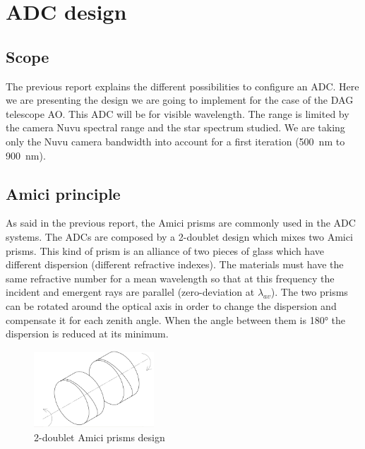 \newpage
\section{ADC design}\label{app:ADC}
\subsection{Scope}
The previous report explains the different possibilities to configure an ADC. Here we are presenting the design we are going to implement for the case of the DAG telescope AO. This ADC will be for visible wavelength. The range is limited by the camera Nuvu spectral range and the star spectrum studied. We are taking only the Nuvu camera bandwidth into account for a first iteration (500~nm to 900~nm).\\

\subsection{Amici principle}
As said in the previous report, the Amici prisms are commonly used in the ADC systems. The ADCs are composed by a 2-doublet design which mixes two Amici prisms. This kind of prism is an alliance of two pieces of glass which have different dispersion (different refractive indexes). The materials must have the same refractive number for a mean wavelength so that at this frequency the incident and emergent rays are parallel (zero-deviation at $\lambda_{av}$). The two prisms can be rotated around the optical axis in order to change the dispersion and compensate it for each zenith angle. When the angle between them is 180° the dispersion is reduced at its minimum.

\begin{figure}[H]
\centering
	\includegraphics[width = 0.4\textwidth]{images/amiciISO.png}
	\caption{2-doublet Amici prisms design}
	\centering
\end{figure}




